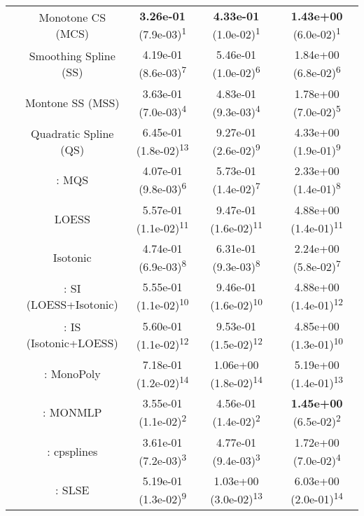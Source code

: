 \begin{tabular}{ccccc}
&Monotone CS (MCS)& \textbf{3.26e-01} (7.9e-03)\textsuperscript{1}& \textbf{4.33e-01} (1.0e-02)\textsuperscript{1}& \textbf{1.43e+00} (6.0e-02)\textsuperscript{1}\tabularnewline
&Smoothing Spline (SS)& 4.19e-01 (8.6e-03)\textsuperscript{7}& 5.46e-01 (1.0e-02)\textsuperscript{6}& 1.84e+00 (6.8e-02)\textsuperscript{6}\tabularnewline
&Montone SS (MSS)& 3.63e-01 (7.0e-03)\textsuperscript{4}& 4.83e-01 (9.3e-03)\textsuperscript{4}& 1.78e+00 (7.0e-02)\textsuperscript{5}\tabularnewline
&Quadratic Spline (QS)& 6.45e-01 (1.8e-02)\textsuperscript{13}& 9.27e-01 (2.6e-02)\textsuperscript{9}& 4.33e+00 (1.9e-01)\textsuperscript{9}\tabularnewline
&\textcite{heMonotoneBsplineSmoothing1998}: MQS& 4.07e-01 (9.8e-03)\textsuperscript{6}& 5.73e-01 (1.4e-02)\textsuperscript{7}& 2.33e+00 (1.4e-01)\textsuperscript{8}\tabularnewline
&LOESS& 5.57e-01 (1.1e-02)\textsuperscript{11}& 9.47e-01 (1.6e-02)\textsuperscript{11}& 4.88e+00 (1.4e-01)\textsuperscript{11}\tabularnewline
&Isotonic& 4.74e-01 (6.9e-03)\textsuperscript{8}& 6.31e-01 (9.3e-03)\textsuperscript{8}& 2.24e+00 (5.8e-02)\textsuperscript{7}\tabularnewline
&\textcite{mammenEstimatingSmoothMonotone1991}: SI (LOESS+Isotonic)& 5.55e-01 (1.1e-02)\textsuperscript{10}& 9.46e-01 (1.6e-02)\textsuperscript{10}& 4.88e+00 (1.4e-01)\textsuperscript{12}\tabularnewline
&\textcite{mammenEstimatingSmoothMonotone1991}: IS (Isotonic+LOESS)& 5.60e-01 (1.1e-02)\textsuperscript{12}& 9.53e-01 (1.5e-02)\textsuperscript{12}& 4.85e+00 (1.3e-01)\textsuperscript{10}\tabularnewline
&\textcite{murrayFastFlexibleMethods2016a}: MonoPoly& 7.18e-01 (1.2e-02)\textsuperscript{14}& 1.06e+00 (1.8e-02)\textsuperscript{14}& 5.19e+00 (1.4e-01)\textsuperscript{13}\tabularnewline
&\textcite{cannonMonmlpMultilayerPerceptron2017}: MONMLP& 3.55e-01 (1.1e-02)\textsuperscript{2}& 4.56e-01 (1.4e-02)\textsuperscript{2}& \textbf{1.45e+00} (6.5e-02)\textsuperscript{2}\tabularnewline
&\textcite{navarro-garciaConstrainedSmoothingOutofrange2023}: cpsplines& 3.61e-01 (7.2e-03)\textsuperscript{3}& 4.77e-01 (9.4e-03)\textsuperscript{3}& 1.72e+00 (7.0e-02)\textsuperscript{4}\tabularnewline
&\textcite{groeneboomConfidenceIntervalsMonotone2023}: SLSE& 5.19e-01 (1.3e-02)\textsuperscript{9}& 1.03e+00 (3.0e-02)\textsuperscript{13}& 6.03e+00 (2.0e-01)\textsuperscript{14}\tabularnewline
\bottomrule
\end{tabular}
